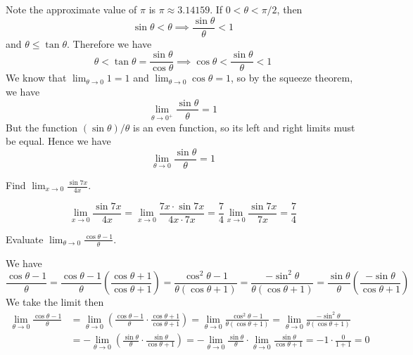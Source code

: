 Note the approximate value of \(\pi\) is \(\pi\approx 3.14159\).
If \(0<\theta<\pi/2\),
then \[\sin\theta<\theta\implies\frac{\sin\theta}{\theta}<1\]
and \(\theta\leq\tan\theta\).
Therefore we have
\[\theta<\tan\theta=\frac{\sin\theta}{\cos\theta}
\implies\cos\theta<\frac{\sin\theta}{\theta}<1\]
We know that \(\displaystyle{\lim_{\theta\to 0}1=1}\) and
\(\displaystyle{\lim_{\theta\to 0}\cos\theta=1}\),
so by the squeeze theorem,
we have
\[\lim_{\theta\to 0^+}\frac{\sin\theta}{\theta}=1\]
But the function \((\sin\theta)/\theta\) is an even function,
so its left and right limits must be equal.
Hence we have
\[\lim_{\theta\to 0}\frac{\sin\theta}{\theta}=1\]
\begin{problem}
    Find \(\displaystyle{\lim_{x\to 0}\frac{\sin 7x}{4x}}\).
\end{problem}
\begin{solution}
    \[\lim_{x\to 0}\frac{\sin 7x}{4x}
    =\lim_{x\to 0}\frac{7x\cdot\sin 7x}{4x\cdot7x}
    =\frac{7}{4}\lim_{x\to 0}\frac{\sin 7x}{7x}=\frac{7}{4}\]
\end{solution}
\begin{problem}
    Evaluate \(\displaystyle{\lim_{\theta\to 0}\frac{\cos\theta-1}{\theta}}\).
\end{problem}
\begin{solution}
    We have
    \[\frac{\cos\theta-1}{\theta}
    =\frac{\cos\theta-1}{\theta}\left(\frac{\cos\theta+1}{\cos\theta+1}\right)
    =\frac{\cos^2\theta-1}{\theta(\cos\theta+1)}
    =\frac{-\sin^2\theta}{\theta(\cos\theta+1)}
    =\frac{\sin\theta}{\theta}\left(\frac{-\sin\theta}{\cos\theta+1}\right)\]
    We take the limit then
    \begin{align*}
        \lim_{\theta\to 0}\frac{\cos\theta-1}{\theta}
        &= \lim_{\theta\to 0}\left(\frac{\cos\theta-1}{\theta}
        \cdot\frac{\cos\theta+1}{\cos\theta+1}\right)
        = \lim_{\theta\to 0}\frac{\cos^2\theta-1}{\theta(\cos\theta+1)}
        = \lim_{\theta\to 0}\frac{-\sin^2\theta}{\theta(\cos\theta+1)} \\
        &= -\lim_{\theta\to 0}\left(\frac{\sin\theta}{\theta}
        \cdot\frac{\sin\theta}{\cos\theta+1}\right)
        =-\lim_{\theta\to 0}\frac{\sin\theta}{\theta}
        \cdot\lim_{\theta\to 0}\frac{\sin\theta}{\cos\theta+1}
        = -1\cdot\frac{0}{1+1}=0
    \end{align*}
\end{solution}